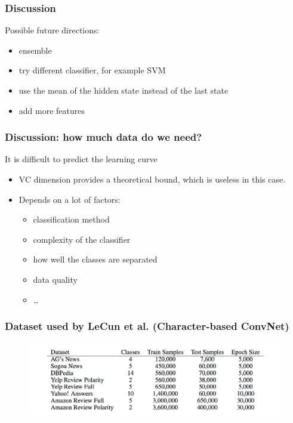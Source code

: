 \documentclass{beamer}
\begin{document}


\begin{frame}
\frametitle{Discussion}
Possible future directions:
\begin{itemize}
\item ensemble
\item try different classifier, for example SVM
\item use the mean of the hidden state instead of the last state
\item add more features 
\end{itemize}


\end{frame}

\begin{frame}
\frametitle{Discussion: how much data do we need?}
It is difficult to predict the learning curve
\begin{itemize}
\item VC dimension provides a theoretical bound, which is useless in this case.
\item Depends on a lot of factors:
\begin{itemize}
\item classification method
\item complexity of the classifier
\item how well the classes are separated
\item data quality
\item \ldots
\end{itemize}
\end{itemize}

\end{frame}

\begin{frame}
\frametitle{Dataset used by LeCun et al. (Character-based ConvNet) }
\begin{figure}
\includegraphics[scale=0.4]{conv_data}
\end{figure}

\end{frame}
\end{document}
